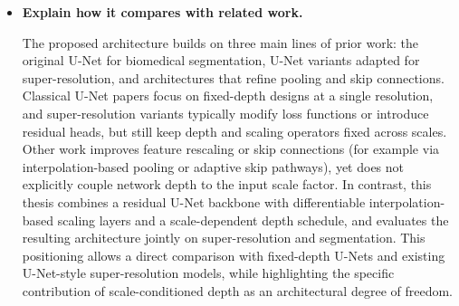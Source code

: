 \begin{itemize}
\item \textbf{Explain how it compares with related work.}

The proposed architecture builds on three main lines of prior work: the original U-Net for biomedical segmentation, U-Net variants adapted for super-resolution, and architectures that refine pooling and skip connections. Classical U-Net papers focus on fixed-depth designs at a single resolution, and super-resolution variants typically modify loss functions or introduce residual heads, but still keep depth and scaling operators fixed across scales. Other work improves feature rescaling or skip connections (for example via interpolation-based pooling or adaptive skip pathways), yet does not explicitly couple network depth to the input scale factor. In contrast, this thesis combines a residual U-Net backbone with differentiable interpolation-based scaling layers and a scale-dependent depth schedule, and evaluates the resulting architecture jointly on super-resolution and segmentation. This positioning allows a direct comparison with fixed-depth U-Nets and existing U-Net-style super-resolution models, while highlighting the specific contribution of scale-conditioned depth as an architectural degree of freedom.

\end{itemize}